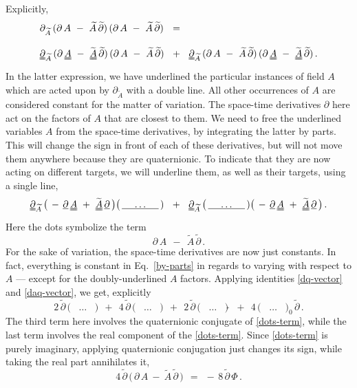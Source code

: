 \documentclass[epsfig,12pt]{article}
\newcommand{\p}{\partial}
\newcommand{\wt}{\widetilde}
\begin{document}
	Explicitly,
\begin{align}
%
\notag
	& \p_{\wt A}\, (\p\, A ~-~ \wt A\,\wt \p)\, (\p\, A ~-~ \wt A\,\wt \p)	~~=~~
	\\[3mm]
%
	& \uuline\p{}_{\wt A}\, (\p\, \uuline A ~-~ \wt{\uuline A}\,\wt \p)\, (\p\, A ~-~ \wt A\,\wt \p)
	~~+~~
	\uuline\p{}_{\wt A}\, (\p\, A ~-~ \wt A\,\wt \p)\, (\p\, \uuline A ~-~ \wt{\uuline A}\,\wt \p)\,.
\end{align}
	In the latter expression, we have underlined the particular instances of field $ A $ which are acted
	upon by $ \p_{\wt A} $ with a double line.
	All other occurrences of $ A $ are considered constant for the matter of variation.
	The space-time derivatives $ \p $ here act on the factors of $ A $ that are closest to them.
	We need to free the underlined variables $ A $ from the space-time derivatives, by integrating the latter
	by parts.
	This will change the sign in front of each of these derivatives, but will not move them anywhere
	because they are quaternionic.
	To indicate that they are now acting on different targets, we will underline them,
	as well as their targets, using a single line,
\begin{equation}
\label{by-parts}
	\uuline\p{}_{\wt A}\,	\big(\, -\,\uline\p\,\uuline A ~+~ \wt{\uuline A}\,\uline\p \,\big)
				\big(\, \uline{~~~~\dots~~~~} \,)
	~~+~~
	\uuline\p{}_{\wt A}\,	\big(\, \uline{~~~~\dots~~~~} \,)
				\big(\, -\,\uline\p\,\uuline A ~+~ \wt{\uuline A}\,\uline\p \,\big)\,.
\end{equation}
	Here the dots symbolize the term
\begin{equation}
\label{dots-term}
	\p\,A  ~~-~~  \wt A\,\wt\p\,.
\end{equation}
	For the sake of variation, the space-time derivatives are now just constants.
	In fact, everything is constant in Eq.~\eqref{by-parts} in regards to varying with respect to $ A $ ---
	except for the doubly-underlined $ A $ factors.
	Applying identities \eqref{dq-vector} and \eqref{daq-vector}, we get, explicitly
\begin{equation}
\label{varied}
	2\,\wt\p\, \big(\, ~~~\dots~~~ \,)  ~~+~~
	4\,\wt\p\, \big(\, ~~~\dots~~~ \,)  ~~+~~
	2\,\wt\p\, \big(\, ~~~\dots~~~ \,)\wt{~}  ~~+~~
	4\, \big(\, ~~~\dots~~~ \,)_0\,\wt\p\,.
\end{equation}
	The third term here involves the quaternionic conjugate of \eqref{dots-term},
	while the last term involves the real component of the \eqref{dots-term}.
	Since \eqref{dots-term} is purely imaginary, applying quaternionic conjugation just changes its sign,
	while taking the real part annihilates it,
\begin{equation}
	4\,\wt\p\,\big(\, \p\,A ~-~ \wt A\,\wt\p \,\big)	~~=~~	-\,8\,\wt\p\,\Phi\,.
\end{equation}
\end{document}
